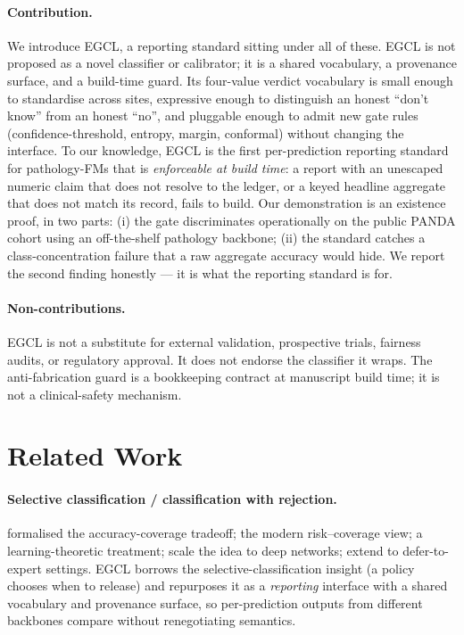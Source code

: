 \documentclass{article}
\begin{document}
\paragraph{Contribution.} We introduce EGCL, a reporting standard sitting under all of these. EGCL is not proposed as a novel classifier or calibrator; it is a shared vocabulary, a provenance surface, and a build-time guard. Its four-value verdict vocabulary is small enough to standardise across sites, expressive enough to distinguish an honest ``don't know'' from an honest ``no'', and pluggable enough to admit new gate rules (confidence-threshold, entropy, margin, conformal) without changing the interface. To our knowledge, EGCL is the first per-prediction reporting standard for pathology-FMs that is \emph{enforceable at build time}: a report with an unescaped numeric claim that does not resolve to the ledger, or a keyed headline aggregate that does not match its record, fails to build. Our demonstration is an existence proof, in two parts: (i) the gate discriminates operationally on the public PANDA cohort using an off-the-shelf pathology backbone; (ii) the standard catches a class-concentration failure that a raw aggregate accuracy would hide. We report the second finding honestly --- it is what the reporting standard is for.

\paragraph{Non-contributions.} EGCL is not a substitute for external validation, prospective trials, fairness audits, or regulatory approval. It does not endorse the classifier it wraps. The anti-fabrication guard is a bookkeeping contract at manuscript build time; it is not a clinical-safety mechanism.

\section{Related Work}
\label{sec:related}

\paragraph{Selective classification / classification with rejection.} \citet{chow1970} formalised the accuracy-coverage tradeoff; \citet{elyaniv2010selective} the modern risk--coverage view; \citet{cortes2016reject} a learning-theoretic treatment; \citet{geifman2017selective,geifman2019selectivenet} scale the idea to deep networks; \citet{mozannar2020defer} extend to defer-to-expert settings. EGCL borrows the selective-classification insight (a policy chooses when to release) and repurposes it as a \emph{reporting} interface with a shared vocabulary and provenance surface, so per-prediction outputs from different backbones compare without renegotiating semantics.
\end{document}
